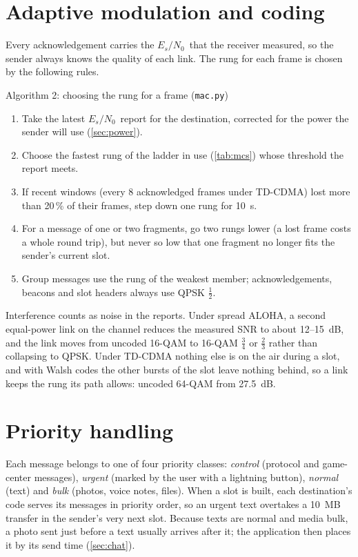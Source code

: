 \documentclass[11pt,a4paper,oneside]{report}
\newcommand{\code}[1]{\texttt{\small #1}}
\newcommand{\EsNo}{\ensuremath{E_s/N_0}}
\begin{document}
\section{Adaptive modulation and coding}\label{sec:amc}
Every acknowledgement carries the \EsNo\ that the receiver measured, so the sender always knows the
quality of each link. The rung for each frame is chosen by the following rules.

\begin{algobox}{Algorithm 2: choosing the rung for a frame (\code{mac.py})}
\small
\begin{enumerate}[leftmargin=*,label=\arabic*.]
  \item Take the latest \EsNo\ report for the destination, corrected for the power the sender will
        use (\cref{sec:power}).
  \item Choose the fastest rung of the ladder in use (\cref{tab:mcs}) whose threshold the report meets.
  \item If recent windows (every 8 acknowledged frames under TD-CDMA) lost more than 20\,\% of their
        frames, step down one rung for \SI{10}{s}.
  \item For a message of one or two fragments, go two rungs lower (a lost frame costs a whole round
        trip), but never so low that one fragment no longer fits the sender's current slot.
  \item Group messages use the rung of the weakest member; acknowledgements, beacons and slot
        headers always use QPSK $\tfrac12$.
\end{enumerate}
\end{algobox}

Interference counts as noise in the reports. Under spread ALOHA, a second equal-power link on the
channel reduces the measured SNR to about 12--\SI{15}{dB}, and the link moves from uncoded 16-QAM to
16-QAM $\tfrac34$ or $\tfrac23$ rather than collapsing to QPSK. Under TD-CDMA nothing else is on the
air during a slot, and with Walsh codes the other bursts of the slot leave nothing behind, so a link
keeps the rung its path allows: uncoded 64-QAM from \SI{27.5}{dB}.

\section{Priority handling}\label{sec:prio}
Each message belongs to one of four priority classes: \emph{control} (protocol and game-center
messages), \emph{urgent} (marked by the user with a lightning button), \emph{normal} (text) and \emph{bulk}
(photos, voice notes, files). When a slot is built, each destination's code serves its messages in
priority order, so an urgent text overtakes a \SI{10}{MB} transfer in the sender's very next slot.
Because texts are normal and media bulk, a photo sent just before a text usually arrives after it;
the application then places it by its send time (\cref{sec:chat}).
\end{document}
